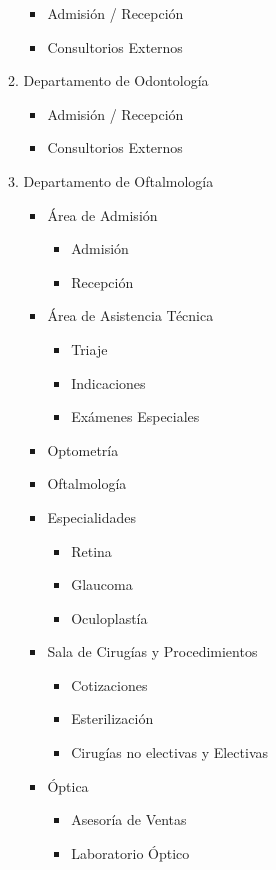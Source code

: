 \begin{enumerate}
\begin{enumerate}
	 	\begin{itemize}
	 		\item Admisión / Recepción
	 		\item Consultorios Externos 
	 	\end{itemize}
	 	\item Departamento de Odontología
	 	\begin{itemize}
	 		\item Admisión / Recepción
	 		\item Consultorios Externos 
	 	\end{itemize}
	 	\item Departamento de Oftalmología
	 	\begin{itemize}
	 		\item Área de Admisión
	 		\begin{itemize}
	 		 	\item Admisión
	 		 	\item Recepción
	 		 \end{itemize}
	 		 \item Área de Asistencia Técnica
	 		 \begin{itemize}
	 		  	\item Triaje
	 		  	\item Indicaciones
	 		  	\item Exámenes Especiales 
	 		  \end{itemize}
	 		  \item Optometría
	 		  \item Oftalmología
	 		  \item Especialidades
	 		  \begin{itemize}
	 		   	\item Retina
	 		   	\item Glaucoma
	 		   	\item Oculoplastía 
	 		   \end{itemize}
	 		  \item Sala de Cirugías y Procedimientos
	 		  \begin{itemize}
	 		   	\item Cotizaciones
	 		   	\item Esterilización
	 		   	\item Cirugías no electivas y Electivas 
	 		   \end{itemize}
	 		  \item Óptica
	 		  \begin{itemize}
	 		   	\item Asesoría de Ventas
	 		   	\item Laboratorio Óptico 
	 		   \end{itemize} 
	 	\end{itemize}
	 \end{enumerate} 
\end{enumerate}

